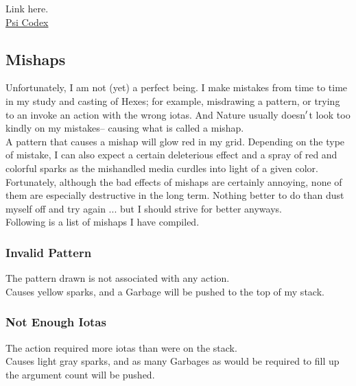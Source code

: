 \documentclass[12pt]{article}
\begin{document}
  
      Link here.\\

  \href{ https://psi.vazkii.us/codex.php\#vectorPrimer }{ Psi Codex }

\newpage

\label{sec:casting/mishaps}
\subsection*{Mishaps}


  
    Unfortunately, I am not (yet) a perfect being. I make mistakes from time to time in my study and casting of Hexes; for example, misdrawing a pattern, or trying to an invoke an action with the wrong iotas. And Nature usually doesn$\rq$t look too kindly on my mistakes-- causing what is called a mishap.\\


  
    A pattern that causes a mishap will glow red in my grid. Depending on the type of mistake, I can also expect a certain deleterious effect and a spray of red and colorful sparks as the mishandled media curdles into light of a given color.\\


  
    Fortunately, although the bad effects of mishaps are certainly annoying, none of them are especially destructive in the long term. Nothing better to do than dust myself off and try again ... but I should strive for better anyways.\\Following is a list of mishaps I have compiled.\\


  \subsubsection*{Invalid Pattern}

    The pattern drawn is not associated with any action.\\Causes yellow sparks, and a Garbage will be pushed to the top of my stack.\\


  \subsubsection*{Not Enough Iotas}

    The action required more iotas than were on the stack.\\Causes light gray sparks, and as many Garbages as would be required to fill up the argument count will be pushed.\\
\end{document}

